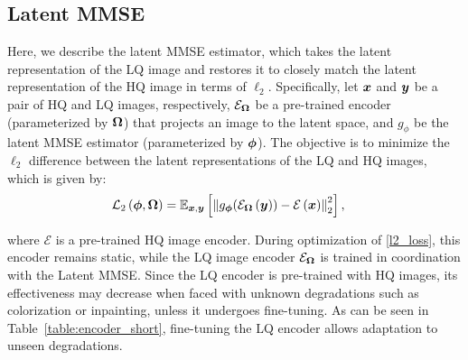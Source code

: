 \subsection{Latent MMSE}\label{lmmse}
Here, we describe the latent MMSE estimator, which takes the latent representation of the LQ image and restores it to closely match the latent representation of the HQ image in terms of $\ell_2$. Specifically, let $\vectorsym{x}$ and $\vectorsym{y}$ be a pair of HQ and LQ images, respectively,  $\mathcal{E}_{\vectorsym{\omega}}$ be a pre-trained encoder (parameterized by $\vectorsym{\omega}$) that projects an image to the latent space, and $g_{{\phi}}$ be the latent MMSE estimator (parameterized by $\vectorsym{\phi}$). The objective is to minimize the $\ell_2$ difference between the latent representations of the LQ and HQ images, which is given by:
\begin{align}\label{l2_loss}
 \mathcal{L}_{2}\brackets{\vectorsym{\phi},\vectorsym{\omega}}&= \expectation{\norm{g_{\vectorsym{\phi}}(\mathcal{E}_{\vectorsym{\omega}}\brackets{\vectorsym{y}})-\mathcal{E}\brackets{\vectorsym{x}}}_2^2}{\vectorsym{x},\vectorsym{y}},
\end{align}


where $\mathcal{E}$ is a pre-trained HQ image encoder. During optimization of \eqref{l2_loss}, this encoder remains static, while the LQ image encoder $\mathcal{E}_{\vectorsym{\omega}}$ is trained in coordination with the Latent MMSE. Since the LQ encoder is pre-trained with HQ images, its effectiveness may decrease when faced with unknown degradations such as colorization or inpainting, unless it undergoes fine-tuning. 
As can be seen in Table~\ref{table:encoder_short}, fine-tuning the LQ encoder allows adaptation to unseen degradations. 


